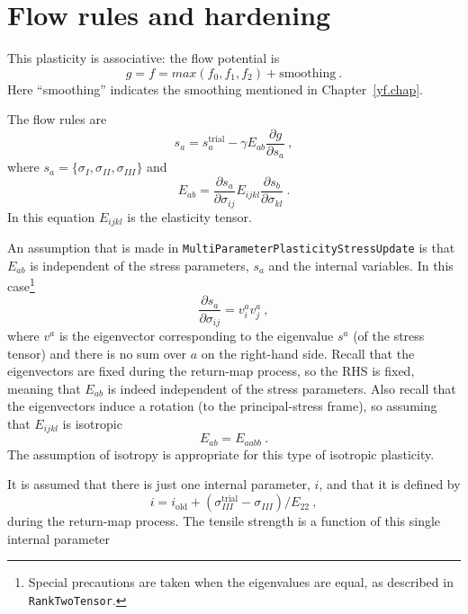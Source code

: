 \documentclass[]{scrreprt}
\newcommand{\ga}{\gamma}
\begin{document}
\chapter{Flow rules and hardening}

This plasticity is associative: the flow potential is
\begin{equation}
  g = f = max(f_{0}, f_{1}, f_{2}) + \mbox{smoothing} \ .
\end{equation}
Here ``smoothing'' indicates the smoothing mentioned in
Chapter~\ref{yf.chap}.

The flow rules are
\begin{equation}
  s_{a} = s_{a}^{\mathrm{trial}} - \ga E_{ab} \frac{\partial
    g}{\partial s_{a}} \ ,
  \label{eqn.flow.rules}
\end{equation}
where $s_{a}=\{\sigma_{I}, \sigma_{II}, \sigma_{III}\}$ and
\begin{equation}
  E_{ab} = \frac{\partial s_{a}}{\partial \sigma_{ij}} E_{ijkl}
  \frac{\partial s_{b}}{\partial \sigma_{kl}} \ .
\end{equation}
In this equation $E_{ijkl}$ is the elasticity tensor.

An assumption
that is made in {\tt  MultiParameterPlasticityStressUpdate} is that
$E_{ab}$ is independent of the stress parameters, $s_{a}$ and the
internal variables.  In this case\footnote{Special precautions are
  taken when the eigenvalues are equal, as described in {\tt RankTwoTensor}.}
\begin{equation}
  \frac{\partial s_{a}}{\partial \sigma_{ij}} = v_{i}^{a}v_{j}^{a} \ ,
\end{equation}
where $v^{a}$ is the eigenvector corresponding to the eigenvalue
$s^{a}$ (of the stress tensor) and there is no sum over $a$ on the
right-hand side.  Recall that the eigenvectors are fixed during the
return-map process, so the RHS is fixed, meaning that $E_{ab}$ is
indeed independent of the stress parameters.  Also recall that the
eigenvectors induce a rotation (to the principal-stress frame), so
assuming that $E_{ijkl}$ is isotropic
\begin{equation}
  E_{ab} = E_{aabb} \ .
\end{equation}
The assumption of isotropy is appropriate for this type of isotropic
plasticity.

It is assumed that there is just one internal parameter, $i$, and that
it is defined by
\begin{equation}
  i = i_{\mathrm{old}} + (\sigma_{III}^{\mathrm{trial}} - \sigma_{III})
  / E_{22} \ ,
\end{equation}
during the return-map process.  The tensile strength is a function of
this single internal parameter
\end{document}
